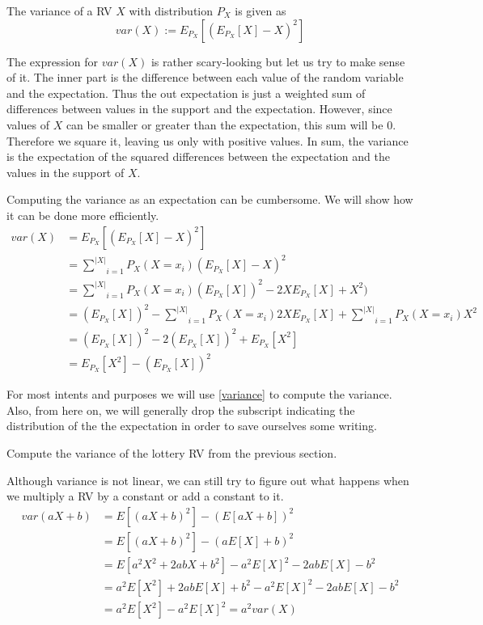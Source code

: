 \documentclass[a4paper,11pt,leqno]{report}
\begin{document}
\begin{Definition}
The variance of a RV $ X $ with distribution $ P_{X} $ is given as
$$ var(X) := E_{P_{X}}[(E_{P_{X}}[X] - X)^{2}] $$
\end{Definition}

The expression for $ var(X) $ is rather scary-looking but let us try to make sense of it. The inner part is the difference between
each value of the random variable and the expectation. Thus the out expectation is just a weighted sum of differences between 
values in the support and the expectation. However, since values of $ X $ can be smaller or greater than the expectation, this
sum will be 0. Therefore we square it, leaving us only with positive values. In sum, the variance is the expectation
of the squared differences between the expectation and the values in the support of $ X $.

Computing the variance as an expectation can be cumbersome. We will show how it can be done more efficiently.
\begin{align}
var(X) &= E_{P_{X}}[(E_{P_{X}}[X] - X)^{2}] \\
&= \underset{i = 1}{\overset{|X|}{\sum}} P_{X}(X=x_{i}) (E_{P_{X}}[X] - X)^{2} \\
&= \underset{i = 1}{\overset{|X|}{\sum}} P_{X}(X=x_{i}) (E_{P_{X}}[X])^{2} - 2XE_{P_{X}}[X] + X^{2}) \\
&= (E_{P_{X}}[X])^{2} - \underset{i = 1}{\overset{|X|}{\sum}} P_{X}(X=x_{i}) 2XE_{P_{X}}[X]
+  \underset{i = 1}{\overset{|X|}{\sum}} P_{X}(X=x_{i})  X^{2} \\
&= (E_{P_{X}}[X])^{2} -  2(E_{P_{X}}[X])^{2} +  E_{P_{X}}[X^{2}] \\
&= E_{P_{X}}[X^{2}] - (E_{P_{X}}[X])^{2} \label{variance}
\end{align}

For most intents and purposes we will use \ref{variance} to compute the variance. Also, from here on, we will generally drop the 
subscript indicating the distribution of the the expectation in order to save ourselves some writing.

\begin{Exercise}
Compute the variance of the lottery RV from the previous section.
\end{Exercise}

Although variance is not linear, we can still try to figure out what happens when we multiply a RV by a constant or add a constant to it.
\begin{align}
var(aX+b) &= E[(aX+b)^{2}] - (E[aX+b])^{2} \\
&= E[(aX+b)^{2}] - (aE[X]+b)^{2} \\
&= E[a^{2}X^{2} + 2abX + b^{2}] - a^{2}E[X]^{2} - 2abE[X] - b^{2} \\
&= a^{2}E[X^{2}] + 2abE[X] + b^{2} - a^{2}E[X]^{2} - 2abE[X] - b^{2} \\
&= a^{2}E[X^{2}] - a^{2}E[X]^{2} = a^{2}var(X) \
\end{align}
\end{document}
